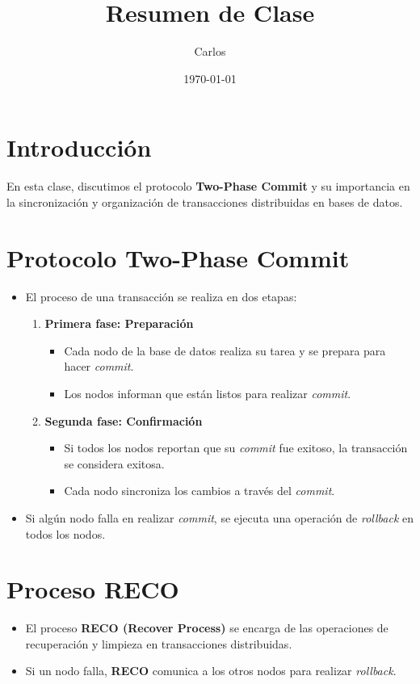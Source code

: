 \documentclass{article}
\title{Resumen de Clase}
\author{Carlos}
\date{\today}
\begin{document}
\maketitle

\section{Introducción}
En esta clase, discutimos el protocolo \textbf{Two-Phase Commit} y su importancia en la sincronización y organización de transacciones distribuidas en bases de datos.

\section{Protocolo Two-Phase Commit}
\begin{itemize}
    \item El proceso de una transacción se realiza en dos etapas:
    \begin{enumerate}
        \item \textbf{Primera fase: Preparación}
        \begin{itemize}
            \item Cada nodo de la base de datos realiza su tarea y se prepara para hacer \textit{commit}.
            \item Los nodos informan que están listos para realizar \textit{commit}.
        \end{itemize}
        \item \textbf{Segunda fase: Confirmación}
        \begin{itemize}
            \item Si todos los nodos reportan que su \textit{commit} fue exitoso, la transacción se considera exitosa.
            \item Cada nodo sincroniza los cambios a través del \textit{commit}.
        \end{itemize}
    \end{enumerate}
    \item Si algún nodo falla en realizar \textit{commit}, se ejecuta una operación de \textit{rollback} en todos los nodos.
\end{itemize}

\section{Proceso RECO}
\begin{itemize}
    \item El proceso \textbf{RECO (Recover Process)} se encarga de las operaciones de recuperación y limpieza en transacciones distribuidas.
    \item Si un nodo falla, \textbf{RECO} comunica a los otros nodos para realizar \textit{rollback}.
\end{itemize}
\end{document}
